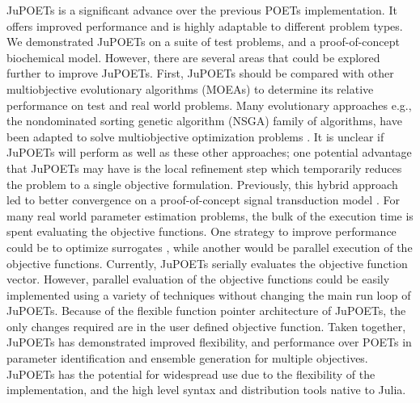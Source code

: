 \documentclass{bmcart}
\begin{document}
JuPOETs is a significant advance over the previous POETs implementation.
It offers improved performance and is highly adaptable to different problem types.
We demonstrated JuPOETs on a suite of test problems, and a proof-of-concept biochemical model.
However, there are several areas that could be explored further to improve JuPOETs.
First, JuPOETs should be compared with other multiobjective evolutionary algorithms (MOEAs) to determine its relative performance on test and real world problems.
Many evolutionary approaches e.g., the nondominated sorting genetic algorithm (NSGA) family of algorithms, have been adapted to solve multiobjective optimization problems \cite{DEB2002,HUBAND2006}. It is unclear if JuPOETs will perform as well as these other approaches;
one potential advantage that JuPOETs may have is the local refinement step which temporarily reduces the problem to a single objective formulation.
Previously, this hybrid approach led to better convergence on a proof-of-concept signal transduction model \cite{Song:2010aa}.
For many real world parameter estimation problems, the bulk of the execution time is spent evaluating the objective functions.
One strategy to improve performance could be to optimize surrogates \cite{SURROGATES}, while another would be parallel execution of the objective functions.
Currently, JuPOETs serially evaluates the objective function vector.
However, parallel evaluation of the objective functions could be easily implemented using a variety of techniques without changing the main run loop of JuPOETs.
Because of the flexible function pointer architecture of JuPOETs, the only changes required are in the user defined objective function.
Taken together, JuPOETs has demonstrated improved flexibility, and performance over POETs in parameter identification and ensemble generation for multiple objectives.
JuPOETs has the potential for widespread use due to the flexibility of the implementation, and the high level syntax and distribution tools native to Julia.




\end{document}
